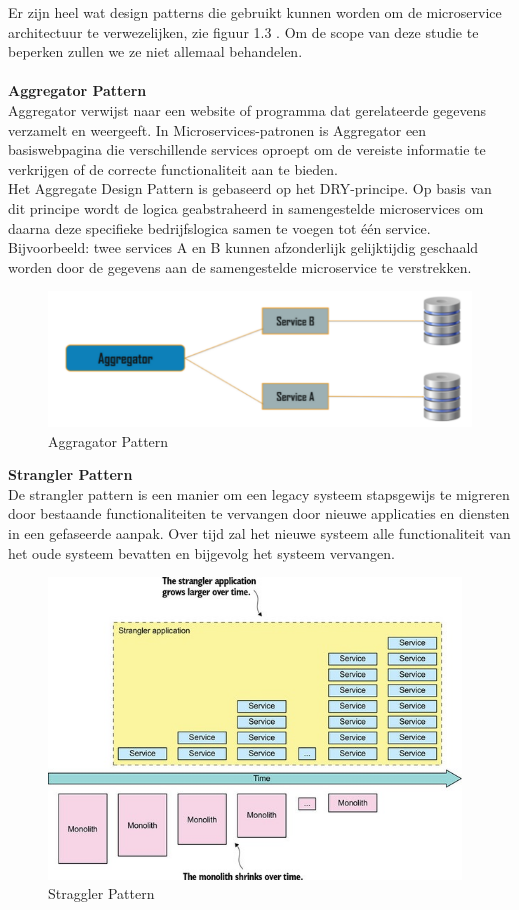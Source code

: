 Er zijn heel wat design patterns die gebruikt kunnen worden om de microservice architectuur te verwezelijken, zie figuur 1.3 . Om de scope van deze studie te beperken zullen we ze niet allemaal behandelen.\\ \\
\textbf{Aggregator Pattern}\\
Aggregator verwijst naar een website of programma dat gerelateerde gegevens verzamelt en weergeeft. In Microservices-patronen is Aggregator een basiswebpagina die verschillende services oproept om de vereiste informatie te verkrijgen of de correcte functionaliteit aan te bieden.\\
Het Aggregate Design Pattern is gebaseerd op het DRY-principe. Op basis van dit principe wordt de logica geabstraheerd in samengestelde microservices om daarna deze specifieke bedrijfslogica samen te voegen tot één service.
Bijvoorbeeld: twee services A en B kunnen afzonderlijk gelijktijdig geschaald worden door de gegevens aan de samengestelde microservice te verstrekken.

\begin{figure}[!htb]
    \caption{Aggragator Pattern}
    \centering
    \includegraphics[width=1\textwidth]{Aggregator.png}
\end{figure}

\textbf{Strangler Pattern}\\
De strangler pattern is een manier om een legacy systeem stapsgewijs te migreren door bestaande functionaliteiten te vervangen door nieuwe applicaties en diensten in een gefaseerde aanpak. Over tijd zal het nieuwe systeem alle functionaliteit van het oude systeem bevatten en bijgevolg het systeem vervangen.

\begin{figure}[!htb]
    \caption{Straggler Pattern}
    \centering
    \includegraphics[height=8cm]{strangler.jpg}
\end{figure}

